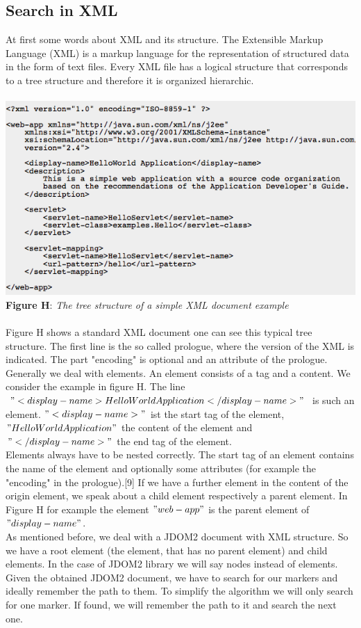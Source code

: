 \subsection{Search in XML}
At first some words about XML and its structure. The Extensible Markup Language (XML) is a markup language for the representation of structured data in the form of text files. Every XML file has a logical structure that corresponds to a tree structure and therefore it is organized hierarchic.
\\ \\ \includegraphics[width=1.0\textwidth]{xml_sample.png}  \\\textbf{Figure H}: \textit{The tree structure of a simple XML document example}  \\ \\  Figure H shows a standard XML document one can see this typical tree structure. The first line is the so called prologue, where the version of the XML is indicated. The part "encoding" is optional and an attribute of the prologue. Generally we deal with elements. An element consists of a tag and a content. We consider the example in figure H. The line  $"<display-name>HelloWorld Application</display-name>"$ is such an element. $"<display-name>"$ ist the start tag of the element, $"HelloWorld Application"$ the content of the element and $"</display-name>"$ the end tag of the element. \\ Elements always have to be nested correctly. The start tag of an element contains the name of the element and optionally some attributes (for example the "encoding" in the prologue).[9] If we have a further element in the content of the origin element, we speak about a child element respectively a parent element. In Figure H for example the element $"web-app"$ is the parent element of $"display-name"$.\\ As mentioned before, we deal with a JDOM2 document with XML structure. So we have a root element (the element, that has no parent element) and child elements. In the case of JDOM2 library we will say nodes instead of elements.\\ Given the obtained JDOM2 document, we have to search for our markers and ideally remember the path to them. To simplify the algorithm we will only search for one marker. If found, we will remember the path to it and search the next one.  \\





